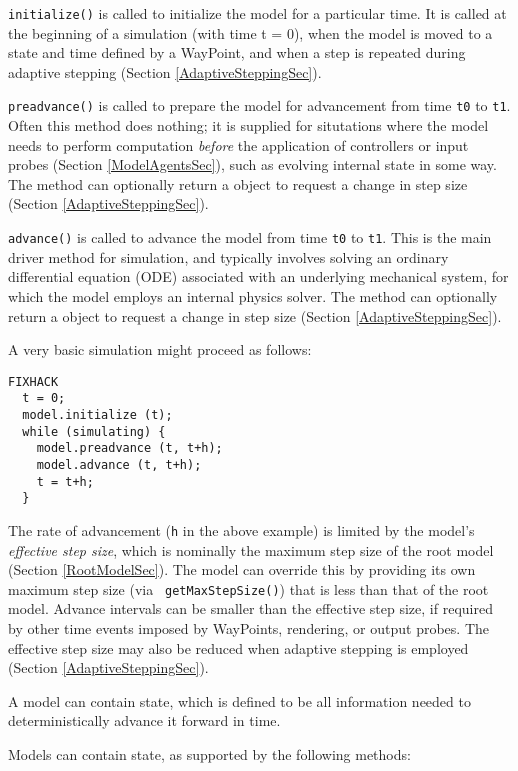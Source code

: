 \documentclass{article}
\begin{document}
{\tt initialize()} is called to initialize the model for a particular
time. It is called at the beginning of a simulation (with time t = 0),
when the model is moved to a state and time defined by a
WayPoint, and when a step is repeated during adaptive stepping
(Section \ref{AdaptiveSteppingSec}).

{\tt preadvance()} is called to prepare the model for advancement from
time {\tt t0} to {\tt t1}. Often this method does nothing; it is
supplied for situtations where the model needs to perform computation
{\it before} the application of controllers or input probes (Section
\ref{ModelAgentsSec}), such as evolving internal state in some way.
The method can optionally return a  object to
request a change in step size (Section \ref{AdaptiveSteppingSec}).

{\tt advance()} is called to advance the model from time {\tt t0} to
{\tt t1}. This is the main driver method for simulation, and typically
involves solving an ordinary differential equation (ODE) associated
with an underlying mechanical system, for which the model employs an
internal physics solver. The method can optionally return a
 object to request a change in step size
(Section \ref{AdaptiveSteppingSec}).

A very basic simulation might proceed as follows:

\begin{lstlisting}FIXHACK
  t = 0;
  model.initialize (t);
  while (simulating) {
    model.preadvance (t, t+h);
    model.advance (t, t+h);
    t = t+h;
  }
\end{lstlisting}

The rate of advancement ({\tt h} in the above example) is limited by
the model's {\it effective step size}, which is nominally the maximum
step size of the root model (Section \ref{RootModelSec}). The model
can override this by providing its own maximum step size (via {\tt
getMaxStepSize()}) that is less than that of the root model.  Advance
intervals can be smaller than the effective step size, if required by
other time events imposed by WayPoints, rendering, or output
probes. The effective step size may also be reduced when adaptive
stepping is employed (Section \ref{AdaptiveSteppingSec}).

A model can contain state, which is defined to be all information
needed to deterministically advance it forward in time.

Models can contain state, as supported by the following methods:
\end{document}
